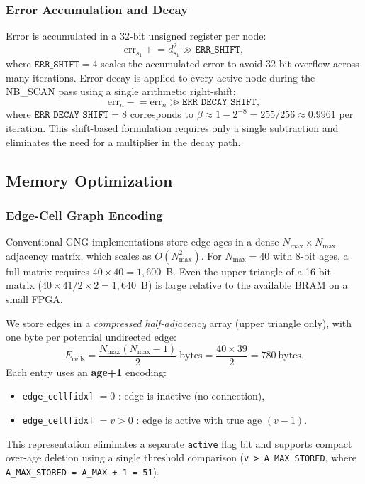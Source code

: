 \documentclass[conference]{IEEEtran}
\begin{document}
\subsubsection{Error Accumulation and Decay}
Error is accumulated in a 32-bit unsigned register per node:
\begin{equation}
\mathrm{err}_{s_1} \mathrel{+}= d^2_{s_1} \gg \texttt{ERR\_SHIFT},
\end{equation}
where $\texttt{ERR\_SHIFT} = 4$ scales the accumulated error to avoid 32-bit overflow across many iterations. Error decay is applied to every active node during the NB\_SCAN pass using a single arithmetic right-shift:
\begin{equation}
\mathrm{err}_n \mathrel{-}= \mathrm{err}_n \gg \texttt{ERR\_DECAY\_SHIFT},
\end{equation}
where $\texttt{ERR\_DECAY\_SHIFT} = 8$ corresponds to $\beta \approx 1 - 2^{-8} = 255/256 \approx 0.9961$ per iteration. This shift-based formulation requires only a single subtraction and eliminates the need for a multiplier in the decay path.

\subsection{Memory Optimization}
\label{sec:memory_opt}

\subsubsection{Edge-Cell Graph Encoding}
Conventional GNG implementations store edge ages in a dense $N_{\max} \times N_{\max}$ adjacency matrix, which scales as $O(N_{\max}^2)$. For $N_{\max} = 40$ with 8-bit ages, a full matrix requires $40 \times 40 = 1{,}600$~B. Even the upper triangle of a 16-bit matrix ($40 \times 41 / 2 \times 2 = 1{,}640$~B) is large relative to the available BRAM on a small FPGA.

We store edges in a \emph{compressed half-adjacency} array (upper triangle only), with one byte per potential undirected edge:
\[
E_{\text{cells}} = \frac{N_{\max}(N_{\max}-1)}{2}\ \text{bytes} = \frac{40 \times 39}{2} = 780\ \text{bytes}.
\]
Each entry uses an \textbf{age+1} encoding:
\begin{itemize}
  \item \texttt{edge\_cell[idx]} $= 0$ : edge is inactive (no connection),
  \item \texttt{edge\_cell[idx]} $= v > 0$ : edge is active with true age $(v-1)$.
\end{itemize}
This representation eliminates a separate \texttt{active} flag bit and supports compact over-age deletion using a single threshold comparison (\texttt{v > A\_MAX\_STORED}, where \texttt{A\_MAX\_STORED = A\_MAX + 1 = 51}).
\end{document}
